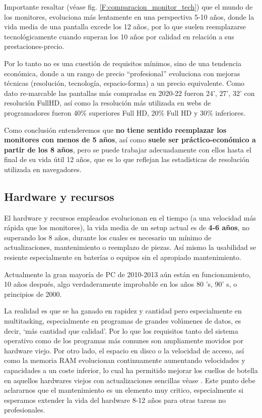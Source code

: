 Importante resaltar (véase fig. \ref{F:comparacion_monitor_tech}) que el mundo de los monitores, evoluciona más lentamente en una perspectiva 5-10 años, donde la vida media de una pantalla excede los 12 años, por lo que suelen reemplazarse tecnológicamente cuando superan los 10 años por calidad en relación a sus prestaciones-precio.

Por lo tanto no es una cuestión de requisitos mínimos, sino de una tendencia económica, donde a un rango de precio “profesional” evoluciona con mejoras técnicas (resolución, tecnología, espacio-forma) a un precio equivalente. Como dato re-marcable\cite{c_resolucion_estadisticas_W3Schools} las pantallas más compradas en 2020-22 fueron 24’, 27’, 32’ con resolución FullHD, así como la resolución más utilizada en webs de programadores fueron 40\% superiores Full HD, 20\% Full HD y 30\% inferiores.

Como conclusión entenderemos que \textbf{no tiene sentido reemplazar los monitores con menos de 5 años}, así como \textbf{suele ser práctico-económico a partir de los 8 años}, pero se puede trabajar adecuadamente con ellos hasta el final de su vida útil 12 años, que es lo que reflejan las estadísticas de resolución utilizada en navegadores.

\subsection{Hardware y recursos}\label{S:hardware_recursos}
El hardware y recursos empleados evolucionan en el tiempo (a una velocidad más rápida que los monitores), la vida media de un setup actual es de \textbf{4-6 años}, no superando los 8 años, durante los cuales es necesario un mínimo de actualizaciones, mantenimiento o reemplazo de piezas. Así mismo la usabilidad se resiente especialmente en baterías o equipos sin el apropiado mantenimiento.

Actualmente la gran mayoría de PC de 2010-2013 aún están en funcionamiento, 10 años después, algo verdaderamente improbable en los años 80 's, 90' s,  o principios de 2000.

 La realidad es que se ha ganado en rapidez y cantidad pero especialmente en multitasking, especialmente en programas de grandes volúmenes de datos, es decir, ‘más cantidad que calidad’. Por lo que los requisitos tanto del sistema operativo como de los programas más comunes son ampliamente movidos por hardware viejo. Por otro lado, el espacio en disco o la velocidad de acceso, así como la memoria RAM evolucionan continuamente aumentando velocidades y capacidades a un coste inferior, lo cual ha permitido mejorar los cuellos de botella en aquellos hardwares viejos con actualizaciones sencillas véase \cite{c_guia_hardware}. Este punto debe aclararnos que el mantenimiento es un elemento muy critico, especialmente si esperamos extender la vida del hardware 8-12 años para otras tareas no profesionales.

